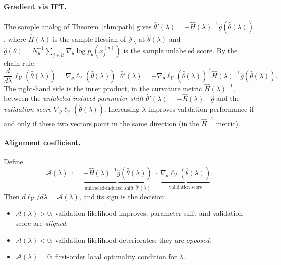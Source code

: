 \documentclass[11pt]{article}
\theoremstyle{definition}
\newcommand{\calU}{\mathcal{U}}
\newcommand{\calJ}{\mathcal{J}}
\newcommand{\lam}{\lambda}
\newcommand{\calV}{\mathcal{V}}
\newcommand{\calA}{\mathcal{A}}
\begin{document}
\paragraph{Gradient via IFT.}
The sample analog of Theorem~\ref{thm:path} gives
\(\hat\theta'(\lam) = -\hat H(\lam)^{-1}\hat g(\hat\theta(\lam))\),
where \(\hat H(\lam)\) is the sample Hessian of \(\calJ_\lam\) at
\(\hat\theta(\lam)\) and \(\hat g(\theta) = N_u^{-1}\sum_{j\in\calU}
\nabla_\theta\log p_\theta(x_j^{(u)})\) is the sample unlabeled score.
By the chain rule,
\begin{equation}
\label{eq:lam-gradient}
\frac{d}{d\lam}\,\ell_{\calV}(\hat\theta(\lam))
= \nabla_\theta\ell_{\calV}(\hat\theta(\lam))^\top \hat\theta'(\lam)
= -\nabla_\theta\ell_{\calV}(\hat\theta(\lam))^\top
  \hat H(\lam)^{-1}\hat g(\hat\theta(\lam)).
\end{equation}
The right-hand side is the inner product, in the curvature metric
\(\hat H(\lam)^{-1}\), between the \emph{unlabeled-induced parameter shift}
\(\hat\theta'(\lam) = -\hat H(\lam)^{-1}\hat g\) and the
\emph{validation score} \(\nabla_\theta\ell_{\calV}(\hat\theta(\lam))\).
Increasing \(\lam\) improves validation performance if and only if these
two vectors point in the same direction (in the \(\hat H^{-1}\) metric).

\paragraph{Alignment coefficient.}
Define
\[
\calA(\lam)
\;:=\;
\underbrace{-\hat H(\lam)^{-1}\hat g(\hat\theta(\lam))}_{\text{unlabeled-induced shift }\hat\theta'(\lam)}
\;\cdot\;
\underbrace{\nabla_\theta\ell_{\calV}(\hat\theta(\lam))}_{\text{validation score}}.
\]
Then \(d\ell_{\calV}/d\lam = \calA(\lam)\), and its sign is the decision:
\begin{itemize}[leftmargin=1.2em,itemsep=0pt]
\item \(\calA(\lam)>0\): validation likelihood improves; parameter shift
      and validation score are \emph{aligned}.
\item \(\calA(\lam)<0\): validation likelihood deteriorates; they are
      \emph{opposed}.
\item \(\calA(\lam)=0\): first-order local optimality condition for \(\lam\).
\end{itemize}
\end{document}
